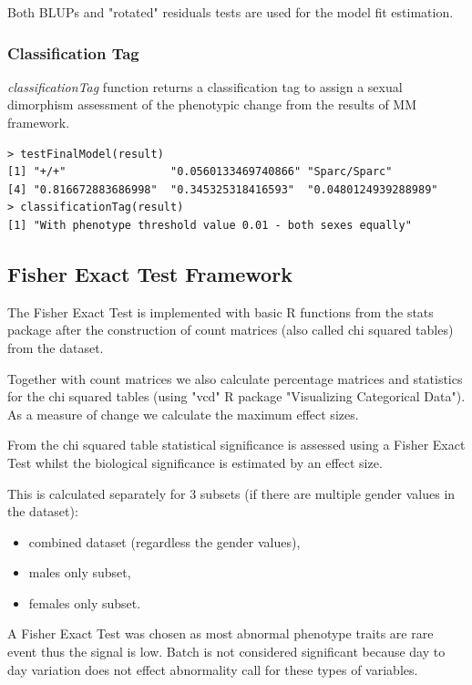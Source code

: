 \documentclass[12pt,a4paper]{article}
\begin{document}
Both BLUPs and "rotated" residuals tests are used for the model fit estimation.

\subsubsection{Classification Tag}
\textit{classificationTag} function returns a classification tag to assign a sexual dimorphism assessment of the phenotypic change from the results of MM framework.
\begingroup
    \fontsize{8pt}{12pt}\selectfont
\begin{verbatim}
> testFinalModel(result)
[1] "+/+"                "0.0560133469740866" "Sparc/Sparc"       
[4] "0.816672883686998"  "0.345325318416593"  "0.0480124939288989"
> classificationTag(result)
[1] "With phenotype threshold value 0.01 - both sexes equally"
\end{verbatim}
\endgroup


\subsection{Fisher Exact Test Framework}
\label{section:FET}
The Fisher Exact Test is implemented with basic R functions from the stats package after the construction of count matrices (also called chi squared tables) from the dataset. 

Together with count matrices we also calculate percentage matrices and statistics for the chi squared tables (using "vcd" R package "Visualizing Categorical Data").  As a measure of change we calculate the maximum effect sizes. 

From the chi squared table statistical significance is assessed using a Fisher Exact Test whilst the biological significance is estimated by an effect size.

This is calculated separately for 3 subsets (if there are multiple gender values in the dataset):
\begin{itemize}
 \item combined dataset (regardless the gender values),
 \item males only subset,
 \item females only subset.
\end{itemize}

A Fisher Exact Test was chosen as most abnormal phenotype traits are rare event thus the signal is low. Batch is not considered significant because day to day variation does not effect abnormality call for these types of variables.
\end{document}
